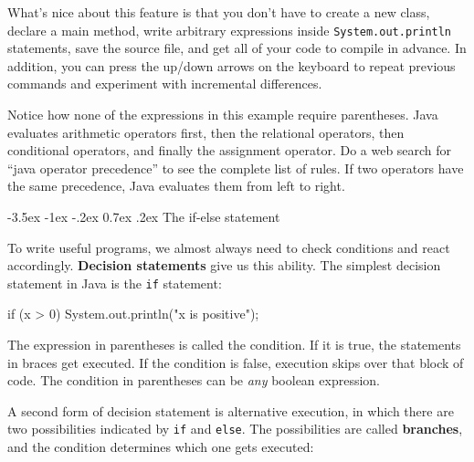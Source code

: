 \documentclass[12pt]{book}
\makeatletter
\theoremstyle{exercise}
\newcommand{\java}[1]{\verb"#1"}
\renewcommand{\section}{\@startsection{section}{1}{\z@}%
    {-3.5ex \@plus -1ex \@minus -.2ex}%
    {0.7ex \@plus.2ex}%
    {\normalfont\Large\bfseries}}
\newcommand{\java}[1]{\lstinline{#1}} %
\makeatother
\begin{document}
What's nice about this feature is that you don't have to create a new class, declare a main method, write arbitrary expressions inside \java{System.out.println} statements, save the source file, and get all of your code to compile in advance.
In addition, you can press the up/down arrows on the keyboard to repeat previous commands and experiment with incremental differences.


Notice how none of the expressions in this example require parentheses.
Java evaluates arithmetic operators first, then the relational operators, then conditional operators, and finally the assignment operator.
Do a web search for ``java operator precedence'' to see the complete list of rules.
If two operators have the same precedence, Java evaluates them from left to right.


\section{The if-else statement}


To write useful programs, we almost always need to check conditions and react accordingly.
{\bf Decision statements} give us this ability.
The simplest decision statement in Java is the \java{if} statement:

\begin{code}
    if (x > 0) {
        System.out.println("x is positive");
    }
\end{code}

The expression in parentheses is called the condition.
If it is true, the statements in braces get executed.
If the condition is false, execution skips over that block of code.
The condition in parentheses can be {\it any} boolean expression.


A second form of decision statement is alternative execution, in which there are two possibilities indicated by \java{if} and \java{else}.
The possibilities are called {\bf branches}, and the condition determines which one gets executed:

\end{document}

